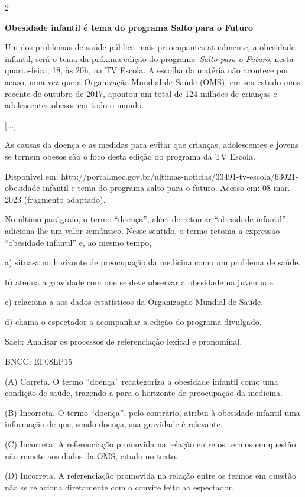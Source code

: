\num{2}

\textbf{Obesidade infantil é tema do programa Salto para o Futuro}

Um dos problemas de saúde pública mais preocupantes atualmente, a
obesidade infantil, será o tema da próxima edição do
programa~\emph{Salto para o Futuro}, nesta quarta-feira, 18, às 20h, na
TV Escola. A escolha da matéria não acontece por acaso, uma vez que a
Organização Mundial de Saúde (OMS), em seu estudo mais recente de
outubro de 2017, apontou um total de 124 milhões de crianças e
adolescentes obesos em todo o mundo.

{[}...{]}

As causas da doença e as medidas para evitar que crianças, adolescentes
e jovens se tornem obesos são o foco desta edição do programa da TV
Escola.

Disponível em:
http://portal.mec.gov.br/ultimas-noticias/33491-tv-escola/63021-obesidade-infantil-e-tema-do-programa-salto-para-o-futuro.
Acesso em: 08 mar. 2023 (fragmento adaptado).

No último parágrafo, o termo ``doença'', além de retomar ``obesidade
infantil'', adiciona-lhe um valor semântico. Nesse sentido, o termo
retoma a expressão ``obesidade infantil'' e, ao mesmo tempo,

a) situa-a no horizonte de preocupação da medicina como um problema de
saúde.

b) atenua a gravidade com que se deve observar a obesidade na juventude.

c) relaciona-a aos dados estatísticos da Organização Mundial de Saúde.

d) chama o espectador a acompanhar a edição do programa divulgado.

Saeb: Analisar os processos de referenciação lexical e pronominal.

BNCC: EF08LP15

(A) Correta. O termo ``doença'' recategoriza a obesidade infantil como
uma condição de saúde, trazendo-a para o horizonte de preocupação da
medicina.

(B) Incorreta. O termo ``doença'', pelo contrário, atribui à obesidade
infantil uma informação de que, sendo doença, sua gravidade é relevante.

(C) Incorreta. A referenciação promovida na relação entre os termos em
questão não remete aos dados da OMS, citado no texto.

(D) Incorreta. A referenciação promovida na relação entre os termos em
questão não se relaciona diretamente com o convite feito ao espectador.


